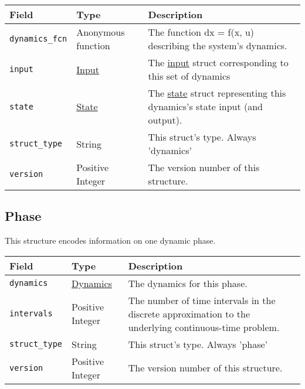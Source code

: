 \documentclass{article}
\begin{document}
			\begin{tabular}{ p{} | p{} | p{}}
				Field                    & Type                               & Description                                      \\ \hline
				\lstinline|dynamics_fcn| & \raggedright Anonymous function    & The function dx = f(x, u) describing the system's
				                                                                dynamics.                                        \\[1ex]
				\lstinline|input|        & \hyperref[sec:input]{Input}        & The \hyperref[sec:input]{input} struct corresponding
				                                                                to this set of dynamics                          \\[1ex]
				\lstinline|state|        & \hyperref[sec:state]{State}        & The \hyperref[sec:state]{state} struct representing
				                                                                this dynamics's state input (and output).        \\[1ex]
				\lstinline|struct_type|  & String                             & This struct's type. Always 'dynamics'            \\[1ex]
				\lstinline|version|      & \raggedright Positive Integer      & The version number of this structure.
			\end{tabular}

		\subsection{Phase}
			\label{sec:phase} %

			This structure encodes information on one dynamic phase.

			\vspace{\baselineskip}

			\begin{tabular}{ p{} | p{} | p{197pt}}
				Field                    & Type                               & Description                                      \\ \hline
				\lstinline|dynamics|     & \hyperref[sec:dynamics]{Dynamics}  & The dynamics for this phase.                     \\[1ex]
				\lstinline|intervals|    & \raggedright Positive Integer      & The number of time intervals in the
				                                                                discrete
				                                                                approximation to the underlying continuous-time
				                                                                problem.                                         \\[1ex]
				\lstinline|struct_type|  & String                             & This struct's type. Always 'phase'               \\[1ex]
				\lstinline|version|      & \raggedright Positive Integer      & The version number of this structure.
			\end{tabular}
\end{document}
